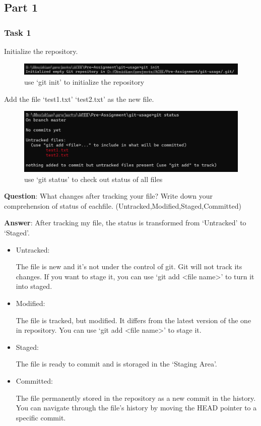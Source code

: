 \subsection{Part 1}
\subsubsection{Task 1}
Initialize the repository.
\begin{figure}[H]
    \centering
    \includegraphics[width = \textwidth]{./figures/init.png}
    \caption{use `git init' to initialize the repository}
\end{figure}

Add the file `test1.txt' `test2.txt' as the new file.
\begin{figure}[H]
\centering
\includegraphics[width = \textwidth]{./figures/status.png}
\caption{use `git status' to check out status of all files}
\end{figure}

\textbf{Question}: What changes after tracking your file? Write down your comprehension of status of eachfile. (Untracked,Modified,Staged,Committed)

\textbf{Answer}: After tracking my file, the status is transformed from `Untracked' to `Staged'.
\begin{itemize}
    \item Untracked:

    The file is new and it's not under the control of git. Git will not track its changes. If you want to stage it, you can use `git add <file name>' to turn it into staged.

    \item Modified:

    The file is tracked, but modified. It differs from the latest version of the one in repository. You can use `git add <file name>' to stage it.

    \item Staged:

    The file is ready to commit and is storaged in the `Staging Area'.

    \item Committed:

    The file permanently stored in the repository as a new commit in the history. You can navigate through the file's history by moving the HEAD pointer to a specific commit.
\end{itemize}

